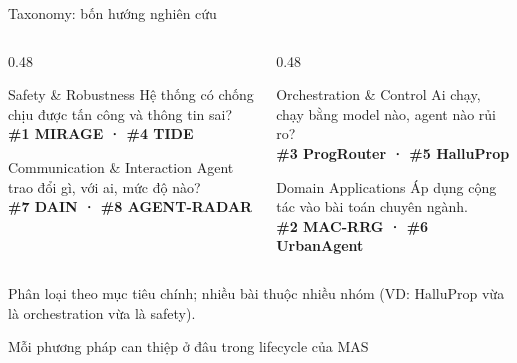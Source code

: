 \documentclass[aspectratio=169,10pt]{beamer}
\begin{document}
\begin{frame}{Taxonomy: bốn hướng nghiên cứu}
  \begin{columns}[T]
    \begin{column}{0.48\textwidth}
      \begin{block}{Safety \& Robustness}
        Hệ thống có chống chịu được tấn công và thông tin sai?\\
        \textbf{\#1 MIRAGE · \#4 TIDE}
      \end{block}
      \begin{block}{Communication \& Interaction}
        Agent trao đổi gì, với ai, mức độ nào?\\
        \textbf{\#7 DAIN · \#8 AGENT-RADAR}
      \end{block}
    \end{column}
    \begin{column}{0.48\textwidth}
      \begin{block}{Orchestration \& Control}
        Ai chạy, chạy bằng model nào, agent nào rủi ro?\\
        \textbf{\#3 ProgRouter · \#5 HalluProp}
      \end{block}
      \begin{block}{Domain Applications}
        Áp dụng cộng tác vào bài toán chuyên ngành.\\
        \textbf{\#2 MAC-RRG · \#6 UrbanAgent}
      \end{block}
    \end{column}
  \end{columns}
  \vspace{4pt}
  {\small Phân loại theo mục tiêu chính; nhiều bài thuộc nhiều nhóm
  (VD: HalluProp vừa là orchestration vừa là safety).}
\end{frame}

\begin{frame}{Mỗi phương pháp can thiệp ở đâu trong lifecycle của MAS}
  \centering
\end{frame}
\end{document}
